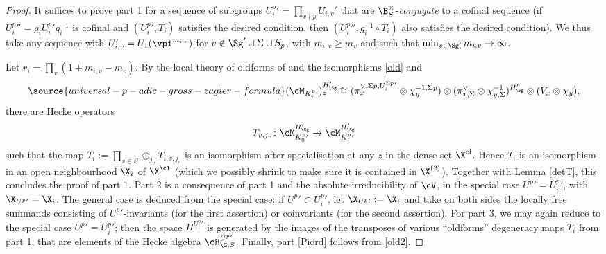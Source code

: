 \begin{proof}
It suffices to prove part 1 for a sequence of subgroups $U_{i}^{p}{}'=\prod_{v\nmid p}U_{i,v}'$ that are $\B_{S}^{\times}$-\emph{conjugate} to a cofinal sequence (if $U_{i}^{p}{}''=g_{i}U_{i}^{p}{}'g_{i}^{-1}$ is cofinal and $(U_{i}^{p}{}', T_{i})$ satisfies the desired condition, then $(U_{i}^{p}{}'', g_{i}^{-1}\circ T_{i} )$ also  satisfies the desired condition).
We thus take any sequence with   $U_{i,v}'=U_{1}(\vpi^{m_{i,v}})$ for $v\notin  {\Sg'}\cup\Sigma \cup S_{p}$, with $m_{i,v} \geq m_{v}$ and such that $\min_{v\in {\Sg'}}m_{i,v}\to \infty$.

Let $r_{i}=\prod_{v}(1+m_{i,v}-m_{v})$. By the local theory of oldforms of   \cite{casselman} and the isomorphisms \eqref{old} and
\begin{align}\label{old2}
\source{universal-p-adic-gross-zagier-formula}
 (\cM_{ K^{p}_{i}{}'})^{ {H_{\Sg}'}}_{z}\cong  (\pi_{x}^{\vee, \Sigma p, U_{i}^{ \Sigma p}{}'}\otimes\chi_{y}^{-1,  \Sigma p})\otimes (\pi_{x, \Sigma}^{\vee}\otimes \chi_{y,\Sigma}^{-1})^{{H_{\Sg}'}} \otimes( V_{x}\otimes \chi_{y}),
\end{align}
 there are Hecke operators $$T_{v, j_{v}} \colon \cM_{ K^{p}_{0}{}'}^{{H_{\Sg}'}}     \to
\cM_{K^{p}_{i}{}'}^{{H_{\Sg}'}}$$ such that the map $T_{i}:=\prod_{v\in S} \oplus_{j_{v}} T_{i, v, j_{v}} $ is an isomorphism after specialisation at any $z$ in the dense set $ \X^{\rm  cl}$. Hence $T_{i}$ is an isomorphism in an open neighbourhood $\X_{i}$ of $ \X^{\cl}$ (which we possibly shrink to make sure it is contained in $\X^{(2)}$).   Together with Lemma \ref{detT}, this concludes the proof of part 1. Part 2 is a consequence of part 1 and the absolute irreducibility of $\cV$, in the special case  $U^{p}{}'=U^{p}_{i}{}'$, with $\X_{U^{p}{}'}=\X_{i}$. The general case is deduced from the special case: if $U^{p}{}'\subset U_{i}^{p}{}'$, let $\X_{U^{p}{}'}:=\X_{i}$ and take  on both sides the locally free summands  consisting of $U^{p}{}'$-invariants (for the first assertion) or coinvariants (for the second assertion). For part 3,  we may again reduce to  the special case $U^{p}{}'=U^{p}_{i}{}'$; then the space $\Pi^{U_{i}^{p}{}'}$  is generated by the images of the transposes of various ``oldforms'' degeneracy maps $T_{i}$ from part 1, that are elements of the Hecke algebra $\cH_{\G, S}^{U^{p}{}'}$. Finally, part \ref{Piord} follows from \eqref{old2}.
\end{proof}




